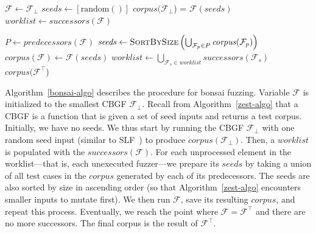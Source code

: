 \documentclass[conference]{IEEEtran}
\newcommand{\tech}{bonsai fuzzing} \newcommand{\Tech}{Bonsai fuzzing} \newcommand{\TECH}{Bonsai Fuzzing}
\begin{document}
\begin{algorithm}[t]
\small
\caption{\Tech{} algorithm}\label{bonsai-algo}
\begin{algorithmic}[1]
    \State $\mathcal{F} \gets \mathcal{F}_{\bot}$
        \State
        $\mathit{seeds} \gets \left[\text{random}()\right]$  
        \State
        $\mathit{corpus}(\mathcal{F}_{\bot}$) = $\mathcal{F}(\mathit{seeds})$  
    \State $\mathit{worklist} \gets \mathit{successors}(\mathcal{F})$
         
        
            \State $P \gets \mathit{predecessors}(\mathcal{F})$
            \State $\mathit{seeds} \gets \textproc{SortBySize}\left(\bigcup_{\mathcal{F}_p \in P} \mathit{corpus}(\mathcal{F}_p)\right)$
            \State $\mathit{corpus}(\mathcal{F}) \gets \mathcal{F}(\mathit{seeds})$  
        \EndFor
        \State $\mathit{worklist} \gets \bigcup_{\mathcal{F}_s \in \mathit{worklist}} \mathit{successors}(\mathcal{F}_s)$
    \EndWhile
    \State \Return $\mathit{corpus}(\mathcal{F}^{\top}$)
\EndProcedure
\end{algorithmic}
\end{algorithm}



Algorithm~\ref{bonsai-algo} describes the procedure for \tech{}. Variable $\mathcal{F}$ is initialized to the smallest CBGF $\mathcal{F}_{\bot}$. Recall from Algorithm~\ref{zest-algo} that a CBGF is a function that is given a set of seed inputs and returns a test corpus. Initially, we have no seeds. We thus start by running the CBGF $\mathcal{F}_{\bot}$ with one random seed input (similar to SLF~\cite{You19}) to produce $\mathit{corpus}(\mathcal{F}_{\bot})$. Then, a $\mathit{worklist}$ is populated with the $\mathit{successors}(\mathcal{F})$. For each unprocessed element in the worklist---that is, each unexecuted fuzzer---we prepare its $\mathit{seeds}$ by taking a union of all test cases in the $\mathit{corpus}$ generated by each of its predecessors. The seeds are also sorted by size in ascending order (so that Algorithm~\ref{zest-algo} encounters smaller inputs to mutate first). We then run $\mathcal{F}$, save its resulting $\mathit{corpus}$, and repeat this process. Eventually, we reach the point where $\mathcal{F} = \mathcal{F}^\top$ and there are no more successors. The final corpus is the result of $\mathcal{F}^\top$.  
\end{document}
